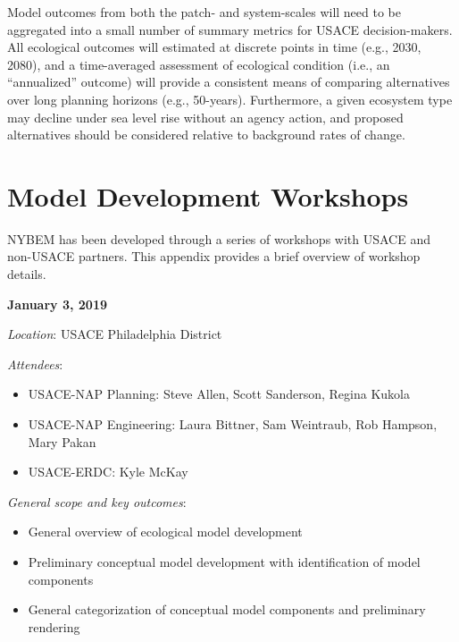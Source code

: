 \documentclass[
]{book}
\providecommand{\tightlist}{%
  \setlength{\itemsep}{0pt}\setlength{\parskip}{0pt}}
\begin{document}
Model outcomes from both the patch- and system-scales will need to be aggregated into a small number of summary metrics for USACE decision-makers. All ecological outcomes will estimated at discrete points in time (e.g., 2030, 2080), and a time-averaged assessment of ecological condition (i.e., an ``annualized'' outcome) will provide a consistent means of comparing alternatives over long planning horizons (e.g., 50-years). Furthermore, a given ecosystem type may decline under sea level rise without an agency action, and proposed alternatives should be considered relative to background rates of change.

\hypertarget{appendix-appendices}{%
\appendix}


\hypertarget{model-development-workshops}{%
\chapter{Model Development Workshops}\label{model-development-workshops}}

NYBEM has been developed through a series of workshops with USACE and non-USACE partners. This appendix provides a brief overview of workshop details.

\textbf{January 3, 2019}

\emph{Location}: USACE Philadelphia District

\emph{Attendees}:

\begin{itemize}
\tightlist
\item
  USACE-NAP Planning: Steve Allen, Scott Sanderson, Regina Kukola\\
\item
  USACE-NAP Engineering: Laura Bittner, Sam Weintraub, Rob Hampson, Mary Pakan\\
\item
  USACE-ERDC: Kyle McKay
\end{itemize}

\emph{General scope and key outcomes}:

\begin{itemize}
\tightlist
\item
  General overview of ecological model development\\
\item
  Preliminary conceptual model development with identification of model components\\
\item
  General categorization of conceptual model components and preliminary rendering
\end{itemize}
\end{document}
